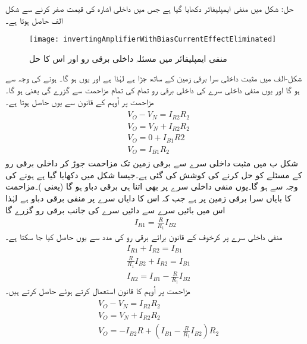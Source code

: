 حل:	شکل  میں منفی ایمپلیفائر دکھایا گیا ہے جس میں داخلی اشارہ کی قیمت صفر کرنے سے شکل   الف حاصل ہوتا ہے۔
\begin{figure}
\centering
\texttt{[image: invertingAmplifierWithBiasCurrentEffectEliminated]}
\caption{منفی ایمپلیفائر میں مسئلہ داخلی برقی رو اور اس کا حل}
\label{شکل_منفی_ایمپلیفائر_اور_داخلی_برقی_رو_کا_مسئلہ}
\end{figure}
شکل-الف میں مثبت داخلی سرا  برقی زمین کے ساتھ جڑا ہے لہٰذا  ہے اور یوں  ہو گا۔ ہونے کی وجہ سے ہو گا اور یوں منفی داخلی سرے  کی داخلی برقی رو تمام کی تمام مزاحمت  سے گزرے گی یعنی ہو گا۔مزاحمت  پر اُوہم کے قانون سے  یوں حاصل ہوتا ہے۔
\begin{gather} \label{مساوات_انحرافی_دباو_کا_خاتمہ_ب}
\begin{aligned}
& V_O-V_N=I_{R2}R_2\\
& V_O =V_N +I_{R2}R_2\\
& V_O = 0 +I_{B1}R2\\
& V_O=I_{B1} R_2
\end{aligned}
\end{gather}
شکل  ب میں مثبت داخلی سرے  سے برقی زمین تک مزاحمت  جوڑ کر داخلی برقی رو کے مسئلے کو حل کرنے کی کوشش کی گئی ہے۔جیسا شکل میں دکھایا گیا ہے  ہونے کی وجہ سے  ہو گا۔یوں منفی داخلی سرے  پر بھی اتنا ہی برقی دباو ہو گا (یعنی )۔مزاحمت  کا بایاں سرا برقی زمین پر ہے جب کہ اس کا دایاں سرے پر منفی برقی دباو ہے لہٰذا اس میں بائیں سرے سے دائیں سرے کی جانب برقی رو گزرے گا
\begin{align*}
I_{R1}=\frac{R}{R_1}I_{B2}
\end{align*}
 منفی داخلی سرے  پر کرخوف کے قانون برائے برقی رو کی مدد سے  یوں حاصل کیا جا سکتا ہے۔
\begin{align*}
&I_{R1}+I_{R2}=I_{B1}\\
&\frac{R}{R_1}I_{B2}+I_{R2}=I_{B1}\\
&I_{R2}=I_{B1}-\frac{R}{R_1}I_{B2}
\end{align*}
مزاحمت  پر اُوہم کا قانون استعمال کرتے ہوئے  حاصل کرتے ہیں۔
\begin{gather} \label{مساوات_انحرافی_دباو_کا_خاتمہ_الف}
\begin{aligned}
& V_O-V_N=I_{R2}R_2\\
& V_O=V_N+I_{R2}R_2\\
& V_O=-I_{B2}R+\left (I_{B1}-\frac{R}{R_1}I_{B2} \right ) R_2
\end{aligned}
\end{gather}
